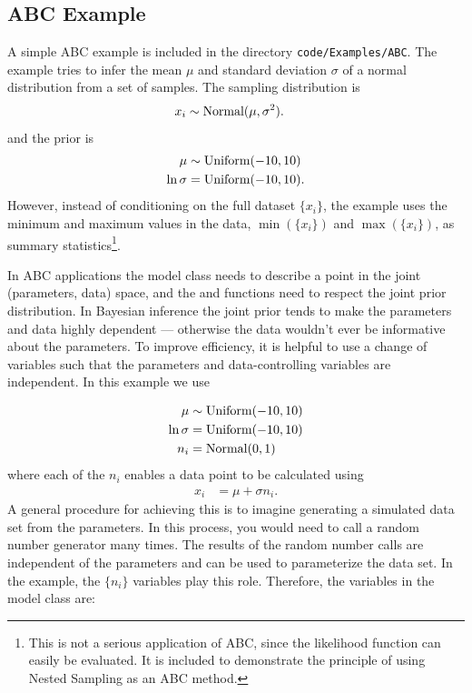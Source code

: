 \documentclass[article]{jss}
\begin{document}
\subsection{ABC Example}
A simple ABC example is included in the directory
{\tt code/Examples/ABC}. The example tries to infer the mean
$\mu$ and standard deviation $\sigma$ of a normal distribution
from a set of samples. The sampling distribution is
\begin{align}
x_i &\sim \textnormal{Normal}(\mu, \sigma^2).
\end{align}
and the prior is
\begin{align}
\mu &\sim \textnormal{Uniform}(-10, 10)\\
\ln\sigma &= \textnormal{Uniform}(-10, 10).
\end{align}
However, instead of conditioning on the full dataset $\{x_i\}$, the example
uses the minimum and maximum values in the data,
$\min(\{x_i\})$ and $\max(\{x_i\})$, as summary statistics\footnote{This is
not a serious application of ABC, since the likelihood function can easily
be evaluated. It is included to demonstrate the principle of using
Nested Sampling as an ABC method.}.

In ABC applications the model class needs to describe a point in the joint
(parameters, data) space, and the  and 
functions need to respect the joint prior distribution.
In Bayesian inference the joint prior tends to make the
parameters and data highly dependent
--- otherwise the data wouldn't ever be informative about the parameters.
To improve efficiency, it is helpful to use a change of variables such that
the parameters and data-controlling variables are independent. In this
example we use

\begin{align}
\mu &\sim \textnormal{Uniform}(-10, 10)\\
\ln\sigma &= \textnormal{Uniform}(-10, 10)\\
n_i &= \textnormal{Normal}(0, 1)
\end{align}
where each of the $n_i$ enables a data point to be calculated using
\begin{align}
x_i &= \mu + \sigma n_i.
\end{align}
A general procedure for achieving this is to imagine generating a
simulated data set from the parameters. In this process, you would need
to call a random number generator many times.
The results of the random number calls
are independent of the parameters and
can be used to parameterize the data set. In the example,
the $\{n_i\}$ variables play this role.
Therefore, the variables in the model class are:
\begin{CodeChunk}
\begin{CodeInput}
class MyModel
{
    private:
        double mu, log_sigma;
        std::vector<double> n;
\end{CodeInput}
\end{CodeChunk}
\end{document}
